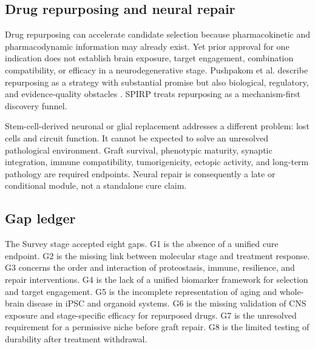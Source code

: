 \documentclass[conference]{IEEEtran}
\begin{document}
\subsection{Drug repurposing and neural repair}
Drug repurposing can accelerate candidate selection because pharmacokinetic and pharmacodynamic information may already exist. Yet prior approval for one indication does not establish brain exposure, target engagement, combination compatibility, or efficacy in a neurodegenerative stage. Pushpakom et al. describe repurposing as a strategy with substantial promise but also biological, regulatory, and evidence-quality obstacles \cite{pushpakom2019}. SPIRP treats repurposing as a mechanism-first discovery funnel.

Stem-cell-derived neuronal or glial replacement addresses a different problem: lost cells and circuit function. It cannot be expected to solve an unresolved pathological environment. Graft survival, phenotypic maturity, synaptic integration, immune compatibility, tumorigenicity, ectopic activity, and long-term pathology are required endpoints. Neural repair is consequently a late or conditional module, not a standalone cure claim.

\subsection{Gap ledger}
The Survey stage accepted eight gaps. G1 is the absence of a unified cure endpoint. G2 is the missing link between molecular stage and treatment response. G3 concerns the order and interaction of proteostasis, immune, resilience, and repair interventions. G4 is the lack of a unified biomarker framework for selection and target engagement. G5 is the incomplete representation of aging and whole-brain disease in iPSC and organoid systems. G6 is the missing validation of CNS exposure and stage-specific efficacy for repurposed drugs. G7 is the unresolved requirement for a permissive niche before graft repair. G8 is the limited testing of durability after treatment withdrawal.
\end{document}
